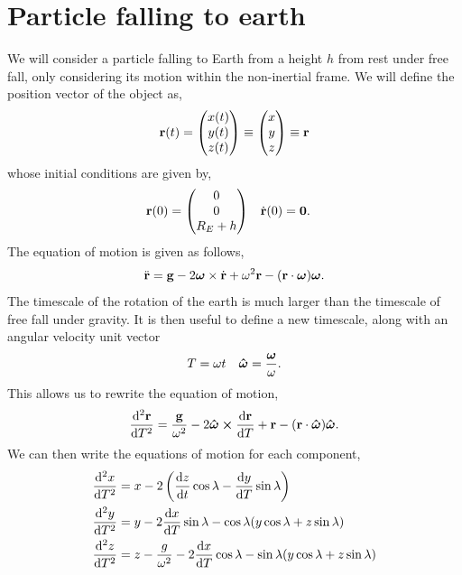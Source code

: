 \documentclass{book}
\begin{document}
\section{Particle falling to earth}
We will consider a particle falling to Earth from a height $h$ from rest under free fall, only considering its motion within the non-inertial frame. We will define the position vector of the object as,
\begin{equation}
    \vb{r}(t) = \begin{pmatrix}
        x(t) \\
        y(t) \\
        z(t)
    \end{pmatrix}
    \equiv 
    \begin{pmatrix}
        x\\
        y\\
        z
    \end{pmatrix} \equiv \vb{r}
\end{equation}
whose initial conditions are given by,
\begin{align}
    \vb{r}(0) & = \begin{pmatrix}
        0 \\
        0 \\
        R_E + h
    \end{pmatrix} 
    &
    \Dot{\vb{r}}(0) & = \vb{0}.
\end{align}
The equation of motion is given as follows,
\begin{equation}
    \Ddot{\vb{r}} = \vb{g} - 2\vb*{\omega}\times\Dot{\vb{r}} + \omega^2\vb{r} - (\vb{r}\cdot\vb*{\omega})\vb*{\omega}.
\end{equation}
The timescale of the rotation of the earth is much larger than the timescale of free fall under gravity. It is then useful to define a new timescale, along with an angular velocity unit vector
\begin{align}
    T& = \omega t & \vu*{\omega}=\frac{\vb*{\omega}}{\omega}.
\end{align}
This allows us to rewrite the equation of motion,
\begin{equation}
    \dv[2]{\vb{r}}{T} = \frac{\vb{g}}{\omega^2} - 2\vu*{\omega}\cross\dv{\vb{r}}{T} + \vb{r} - (\vb{r}\cdot\vu*{\omega})\vu*{\omega}.
\end{equation}
We can then write the equations of motion for each component,
\begin{align}\label{equations}
    \dv[2]{x}{T} &= x - 2\left(\dv{z}{t}\cos\lambda - \dv{y}{T}\sin\lambda\right) \\
    \dv[2]{y}{T} &= y - 2\dv{x}{T}\sin\lambda - \cos\lambda(y\cos\lambda + z\sin\lambda)\label{equations2} \\ 
    \dv[2]{z}{T} &= z - \frac{g}{\omega^2} - 2\dv{x}{T}\cos\lambda - \sin\lambda(y\cos\lambda + z\sin\lambda) \label{equations3}
\end{align}
\end{document}

